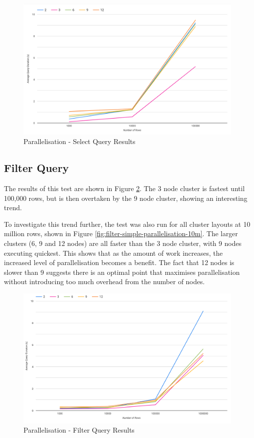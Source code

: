 \begin{figure}[ht]
	\centering
	\includegraphics[width=0.8\linewidth]{chapters/diagrams/testing/select-simple-parallelisation-test}
	\caption{Parallelisation - Select Query Results} 
	\label{fig:select-simple-parallelisation-test}
\end{figure}

\subsection{Filter Query}
The results of this test are shown in Figure \ref{fig:filter-simple-parallelisation-test}. The 3 node cluster is fastest until 100,000 rows, but is then overtaken by the 9 node cluster, showing an interesting trend.

To investigate this trend further, the test was also run for all cluster layouts at 10 million rows, shown in Figure \ref{fig:filter-simple-parallelisation-10m}. The larger clusters (6, 9 and 12 nodes) are all faster than the 3 node cluster, with 9 nodes executing quickest. This shows that as the amount of work increases, the increased level of parallelisation becomes a benefit. The fact that 12 nodes is slower than 9 suggests there is an optimal point that maximises parallelisation without introducing too much overhead from the number of nodes.

\begin{figure}[ht]
	\centering
	\includegraphics[width=0.8\linewidth]{chapters/diagrams/testing/filter-simple-parallelisation-test}
	\caption{Parallelisation - Filter Query Results}
	\label{fig:filter-simple-parallelisation-test}
\end{figure}

